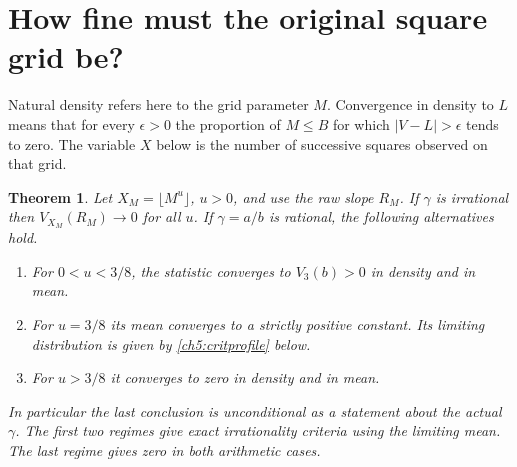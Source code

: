 \documentclass[11pt,a4paper,oneside,openany]{report}
\newtheorem{theorem}{Theorem}[section]
\theoremstyle{remark}\newtheorem{remark}[theorem]{Remark}
\numberwithin{equation}{section}
\begin{document}
\section{How fine must the original square grid be?}\label{ch5:sec:threshold}
Natural density refers here to the grid parameter $M$. Convergence in density to $L$ means that for every $\epsilon>0$ the proportion of $M\le B$ for which $|V-L|>\epsilon$ tends to zero. The variable $X$ below is the number of successive squares observed on that grid.
\begin{theorem}\label{ch5:th:crit}
Let $X_M=\lfloor M^u\rfloor$, $u>0$, and use the raw slope $R_M$. If $\gamma$ is irrational then $V_{X_M}(R_M)\to0$ for all $u$. If $\gamma=a/b$ is rational, the following alternatives hold.
\begin{enumerate}
\item For $0<u<3/8$, the statistic converges to $V_3(b)>0$ in density and in mean.
\item For $u=3/8$ its mean converges to a strictly positive constant. Its limiting distribution is given by \eqref{ch5:critprofile} below.
\item For $u>3/8$ it converges to zero in density and in mean.
\end{enumerate}
In particular the last conclusion is unconditional as a statement about the actual $\gamma$. The first two regimes give exact irrationality criteria using the limiting mean. The last regime gives zero in both arithmetic cases.
\end{theorem}
\end{document}
